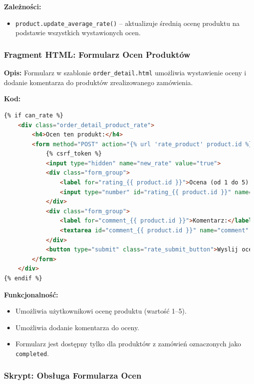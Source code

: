 \documentclass[12pt,a4paper,oneside]{article}
\theoremstyle{definition}
\numberwithin{equation}{section}
\begin{document}
\textbf{Zależności:}
\begin{itemize}
    \item \texttt{product.update\_average\_rate()} – aktualizuje średnią ocenę produktu na podstawie wszystkich wystawionych ocen.
\end{itemize}

\subsubsection{Fragment HTML: Formularz Ocen Produktów}

\textbf{Opis:}  
Formularz w szablonie \texttt{order\_detail.html} umożliwia wystawienie oceny i dodanie komentarza do produktów zrealizowanego zamówienia.

\textbf{Kod:}
\begin{lstlisting}[language=HTML]
{% if can_rate %}
    <div class="order_detail_product_rate">
        <h4>Ocen ten produkt:</h4>
        <form method="POST" action="{% url 'rate_product' product.id %}" class="rating_form">
            {% csrf_token %}
            <input type="hidden" name="new_rate" value="true">
            <div class="form_group">
                <label for="rating_{{ product.id }}">Ocena (od 1 do 5):</label>
                <input type="number" id="rating_{{ product.id }}" name="value" min="1" max="5" required>
            </div>
            <div class="form_group">
                <label for="comment_{{ product.id }}">Komentarz:</label>
                <textarea id="comment_{{ product.id }}" name="comment" rows="3"></textarea>
            </div>
            <button type="submit" class="rate_submit_button">Wyslij ocene</button>
        </form>
    </div>
{% endif %}
\end{lstlisting}

\textbf{Funkcjonalność:}
\begin{itemize}
    \item Umożliwia użytkownikowi ocenę produktu (wartość 1–5).
    \item Umożliwia dodanie komentarza do oceny.
    \item Formularz jest dostępny tylko dla produktów z zamówień oznaczonych jako \texttt{completed}.
\end{itemize}


\subsubsection{Skrypt: Obsługa Formularza Ocen}
\end{document}
